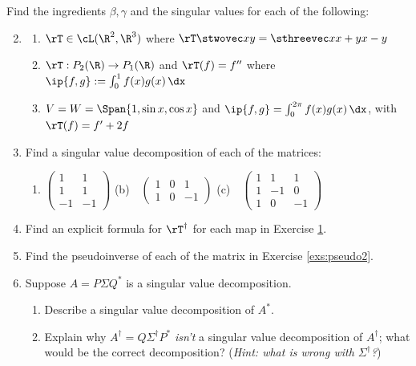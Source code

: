 \begin{exercises}
\exstart\label{exs:pseudo1} Find the ingredients $\beta,\gamma$ and the singular values for each of the following:
\begin{enumerate}\setcounter{enumi}{1}
  \item[]\begin{enumerate}
    \item $\rT\in\cL(\R^2,\R^3)$ where $\rT\stwovec xy=\sthreevec x{x+y}{x-y}$
    \item $\rT:P_2(\R)\to P_1(\R)$ and $\rT(f)=f''$ where $\ip{f,g}:=\int_0^1f(x)g(x)\,\dx$
    \item $V=W=\Span\{1,\sin x,\cos x\}$ and $\ip{f,g}=\int_0^{2\pi}f(x)g(x)\,\dx$, with $\rT(f)=f'+2f$
  \end{enumerate}
  
  \goodbreak
  
  \item\label{exs:pseudo2} Find a singular value decomposition of each of the matrices:
  \begin{enumerate}
    \item $\begin{pmatrix}
    1&1\\1&1\\-1&-1
    \end{pmatrix}$\qquad
    (b)\ \ $\begin{pmatrix}
    1&0&1\\1&0&-1
    \end{pmatrix}$\qquad
    (c)\ \ $\begin{pmatrix}
    1&1&1\\1&-1&0\\1&0&-1
    \end{pmatrix}$
  \end{enumerate}
  
  \item Find an explicit formula for $\rT^\dag$ for each map in Exercise \hyperref[exs:pseudo1]{1}.
  
  \item Find the pseudoinverse of each of the matrix in Exercise \ref{exs:pseudo2}.
  
  \item Suppose $A=P\Sigma Q^*$ is a singular value decomposition.
  \begin{enumerate}
    \item Describe a singular value decomposition of $A^*$.
    \item Explain why $A^\dag=Q\Sigma^\dag P^*$ \emph{isn't} a singular value decomposition of $A^\dag$; what would be the correct decomposition?   	(\emph{Hint: what is wrong with $\Sigma^\dag$?})
  \end{enumerate}
  

\end{enumerate}
\end{exercises}
